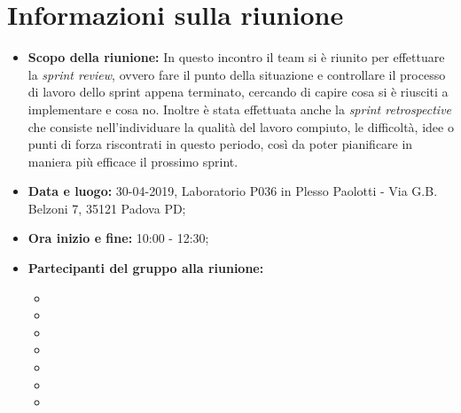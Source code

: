 \clearpage
\section{Informazioni sulla riunione}
\begin{itemize}
	\item \textbf {Scopo della riunione:} In questo incontro il team si è riunito per effettuare la \textit{sprint review}, ovvero fare il punto della situazione e controllare il processo di lavoro dello sprint appena terminato, cercando di capire cosa si è riusciti a implementare e cosa no. Inoltre è stata effettuata anche la \textit{sprint retrospective} che consiste nell'individuare la qualità del lavoro compiuto, le difficoltà, idee o punti di forza riscontrati in questo periodo, così da poter pianificare in maniera più efficace il prossimo sprint.
	\item \textbf {Data e luogo:} 30-04-2019, Laboratorio P036 in Plesso Paolotti - Via G.B. Belzoni 7, 35121 Padova PD;
	\item \textbf {Ora inizio e fine:} 10:00 - 12:30;
	\item \textbf {Partecipanti del gruppo alla riunione:} 
		 \begin{itemize}
			\item \sonia
			\item \pardeep
			\item \luca
			\item \matteo
			\item \alberto
			\item \alessandro
			\item \andrea
		\end{itemize}
\end{itemize}
